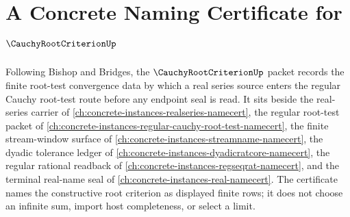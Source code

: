\chapter{A Concrete Naming Certificate for $\CauchyRootCriterionUp$}
\label{ch:concrete-instances-cauchy-root-criterion-namecert}

Following Bishop and Bridges, the $\CauchyRootCriterionUp$ packet records the finite root-test convergence data by which a real series source enters the regular Cauchy root-test route before any endpoint seal is read. It sits beside the real-series carrier of \autoref{ch:concrete-instances-realseries-namecert}, the regular root-test packet of \autoref{ch:concrete-instances-regular-cauchy-root-test-namecert}, the finite stream-window surface of \autoref{ch:concrete-instances-streamname-namecert}, the dyadic tolerance ledger of \autoref{ch:concrete-instances-dyadicratcore-namecert}, the regular rational readback of \autoref{ch:concrete-instances-regseqrat-namecert}, and the terminal real-name seal of \autoref{ch:concrete-instances-real-namecert}. The certificate names the constructive root criterion as displayed finite rows; it does not choose an infinite sum, import host completeness, or select a limit.

